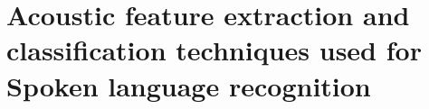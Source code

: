 


\chapter{Acoustic feature extraction and classification techniques used for Spoken language recognition}
\HRule \\[-0.5cm] %



